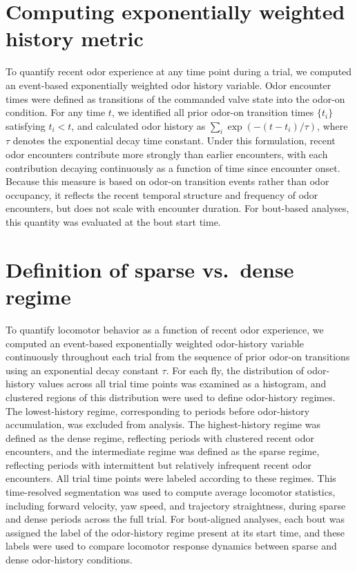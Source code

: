 \section{Computing exponentially weighted history metric}

To quantify recent odor experience at any time point during a trial, we computed an event-based exponentially weighted odor history variable. Odor encounter times were defined as transitions of the commanded valve state into the odor-on condition. For any time $t$, we identified all prior odor-on transition times $\{t_i\}$ satisfying $t_i < t$, and calculated odor history as $\sum_i \exp(-(t - t_i)/\tau)$, where $\tau$ denotes the exponential decay time constant. Under this formulation, recent odor encounters contribute more strongly than earlier encounters, with each contribution decaying continuously as a function of time since encounter onset. Because this measure is based on odor-on transition events rather than odor occupancy, it reflects the recent temporal structure and frequency of odor encounters, but does not scale with encounter duration. For bout-based analyses, this quantity was evaluated at the bout start time.

\section{Definition of sparse vs.\ dense regime}

To quantify locomotor behavior as a function of recent odor experience, we computed an event-based exponentially weighted odor-history variable continuously throughout each trial from the sequence of prior odor-on transitions using an exponential decay constant $\tau$. For each fly, the distribution of odor-history values across all trial time points was examined as a histogram, and clustered regions of this distribution were used to define odor-history regimes. The lowest-history regime, corresponding to periods before odor-history accumulation, was excluded from analysis. The highest-history regime was defined as the dense regime, reflecting periods with clustered recent odor encounters, and the intermediate regime was defined as the sparse regime, reflecting periods with intermittent but relatively infrequent recent odor encounters. All trial time points were labeled according to these regimes. This time-resolved segmentation was used to compute average locomotor statistics, including forward velocity, yaw speed, and trajectory straightness, during sparse and dense periods across the full trial. For bout-aligned analyses, each bout was assigned the label of the odor-history regime present at its start time, and these labels were used to compare locomotor response dynamics between sparse and dense odor-history conditions.

